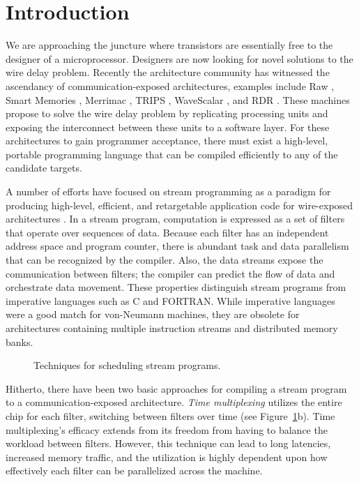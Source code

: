\section{Introduction}

We are approaching the juncture where transistors are essentially free
to the designer of a microprocessor.  Designers are now looking for
novel solutions to the wire delay problem. Recently the architecture
community has witnessed the ascendancy of communication-exposed
architectures, examples include Raw \cite{raw}, Smart Memories
\cite{smartmemories}, Merrimac \cite{merrimac-sc03}, TRIPS
\cite{trips}, WaveScalar \cite{wavescalar}, and RDR \cite{rdr}.  These
machines propose to solve the wire delay problem by replicating
processing units and exposing the interconnect between these units to
a software layer.  For these architectures to gain programmer
acceptance, there must exist a high-level, portable programming
language that can be compiled efficiently to any of the candidate
targets.

A number of efforts have focused on stream programming as a paradigm
for producing high-level, efficient, and retargetable application code
for wire-exposed architectures \cite{streamit-asplos,imagine-ieee,merrimac-sc03,trips-isca03}.
In a stream program, computation is expressed as a set of filters that
operate over sequences of data.  Because each filter has an
independent address space and program counter, there is abundant task
and data parallelism that can be recognized by the compiler.  Also,
the data streams expose the communication between filters; the
compiler can predict the flow of data and orchestrate data movement.
These properties distinguish stream programs from imperative languages
such as C and FORTRAN.  While imperative languages were a good match
for von-Neumann machines, they are obsolete for architectures
containing multiple instruction streams and distributed memory banks.

\begin{figure}[t]
  \centering
  \vspace{-18pt}
  \vspace{-12pt}
  \caption{Techniques for scheduling stream programs. \protect\label{fig:spacevstime}}
  \vspace{-6pt}
\end{figure}

Hitherto, there have been two basic approaches for compiling a stream
program to a communication-exposed architecture.  {\it Time
multiplexing} utilizes the entire chip for each filter, switching
between filters over time (see Figure~\ref{fig:spacevstime}b).  Time
multiplexing's efficacy extends from its freedom from having to
balance the workload between filters.  However, this technique can
lead to long latencies, increased memory traffic, and the utilization
is highly dependent upon how effectively each filter can be
parallelized across the machine.


